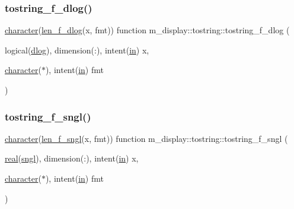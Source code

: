 \mbox{\label{interfacem__display_1_1tostring_a58ee40052cd07a6004c4462fe0028016}} 
\subsubsection{\texorpdfstring{tostring\+\_\+f\+\_\+dlog()}{tostring\_f\_dlog()}}
{\footnotesize\ttfamily \hyperlink{option__stopwatch_83_8txt_abd4b21fbbd175834027b5224bfe97e66}{character}(\hyperlink{namespacem__display_a2a298a8f2faf00047152b93cd265d396}{len\+\_\+f\+\_\+dlog}(x, fmt)) function m\+\_\+display\+::tostring\+::tostring\+\_\+f\+\_\+dlog (\begin{DoxyParamCaption}\item[{logical(\hyperlink{namespacem__display_a8c6a3df510feabf6bc84dd0a8789f98c}{dlog}), dimension(\+:), intent(\hyperlink{M__journal_83_8txt_afce72651d1eed785a2132bee863b2f38}{in})}]{x,  }\item[{\hyperlink{option__stopwatch_83_8txt_abd4b21fbbd175834027b5224bfe97e66}{character}($\ast$), intent(\hyperlink{M__journal_83_8txt_afce72651d1eed785a2132bee863b2f38}{in})}]{fmt }\end{DoxyParamCaption})\hspace{0.3cm}{\ttfamily [private]}}

\mbox{\label{interfacem__display_1_1tostring_a5782bd9b2ad742937bb3e907042c57e6}} 
\subsubsection{\texorpdfstring{tostring\+\_\+f\+\_\+sngl()}{tostring\_f\_sngl()}}
{\footnotesize\ttfamily \hyperlink{option__stopwatch_83_8txt_abd4b21fbbd175834027b5224bfe97e66}{character}(\hyperlink{namespacem__display_ae0feb946fbc4c31f8ba53e20719fa508}{len\+\_\+f\+\_\+sngl}(x, fmt)) function m\+\_\+display\+::tostring\+::tostring\+\_\+f\+\_\+sngl (\begin{DoxyParamCaption}\item[{\hyperlink{read__watch_83_8txt_abdb62bde002f38ef75f810d3a905a823}{real}(\hyperlink{namespacem__display_a2ac86bc535c3ccc5947dbb3109c666b5}{sngl}), dimension(\+:), intent(\hyperlink{M__journal_83_8txt_afce72651d1eed785a2132bee863b2f38}{in})}]{x,  }\item[{\hyperlink{option__stopwatch_83_8txt_abd4b21fbbd175834027b5224bfe97e66}{character}($\ast$), intent(\hyperlink{M__journal_83_8txt_afce72651d1eed785a2132bee863b2f38}{in})}]{fmt }\end{DoxyParamCaption})\hspace{0.3cm}{\ttfamily [private]}}

